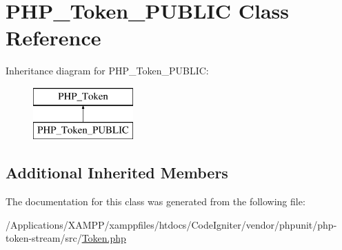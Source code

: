 \hypertarget{class_p_h_p___token___p_u_b_l_i_c}{}\section{P\+H\+P\+\_\+\+Token\+\_\+\+P\+U\+B\+L\+IC Class Reference}
\label{class_p_h_p___token___p_u_b_l_i_c}
Inheritance diagram for P\+H\+P\+\_\+\+Token\+\_\+\+P\+U\+B\+L\+IC\+:\begin{figure}[H]
\begin{center}
\leavevmode
\includegraphics[height=2.000000cm]{class_p_h_p___token___p_u_b_l_i_c}
\end{center}
\end{figure}
\subsection*{Additional Inherited Members}


The documentation for this class was generated from the following file\+:\begin{DoxyCompactItemize}
\item 
/\+Applications/\+X\+A\+M\+P\+P/xamppfiles/htdocs/\+Code\+Igniter/vendor/phpunit/php-\/token-\/stream/src/\mbox{\hyperlink{_token_8php}{Token.\+php}}\end{DoxyCompactItemize}
